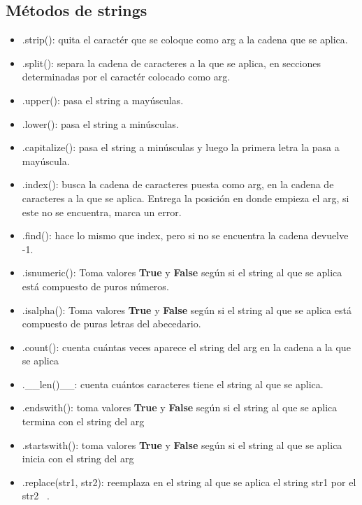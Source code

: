 \documentclass[10pt,oneside]{article}
\begin{document}
\begin{multicols}{2}
        \subsection{Métodos de strings} 
        
            \begin{itemize}
                \item .strip(): quita el caractér que se coloque como arg a la cadena que se aplica.
                \item .split(): separa la cadena de caracteres a la que se aplica, en secciones determinadas por el caractér colocado como arg.
                \item  .upper(): pasa el string a mayúsculas.
                \item  .lower(): pasa el string a minúsculas.
                \item  .capitalize(): pasa el string a minúsculas y luego la primera letra la pasa a mayúscula.
                \item .index(): busca la cadena de caracteres puesta como arg, en la cadena de caracteres a la que se aplica. Entrega la posición en donde empieza el arg, si este no se encuentra, marca un error.
                \item .find(): hace lo mismo que index, pero si no se encuentra la cadena devuelve -1.
                \item .isnumeric(): Toma valores \textbf{True} y \textbf{False} según si el string al que se aplica está compuesto de puros números.
                \item .isalpha(): Toma valores \textbf{True} y \textbf{False} según si el string al que se aplica está compuesto de puras letras del abecedario.
                \item .count(): cuenta cuántas veces aparece el string del arg en la cadena a la que se aplica
                \item .\_\_len()\_\_: cuenta cuántos caracteres tiene el string al que se aplica.
                \item .endswith(): toma valores \textbf{True} y \textbf{False} según si el string al que se aplica termina con el string del arg
                \item .startswith(): toma valores \textbf{True} y \textbf{False} según si el string al que se aplica inicia con el string del arg
                \item .replace(str1, str2): reemplaza en el string al que se aplica el string str1 por el str2 ~\cite{PythonDalto}. 
            \end{itemize} 
            

\end{multicols}
\end{document}
